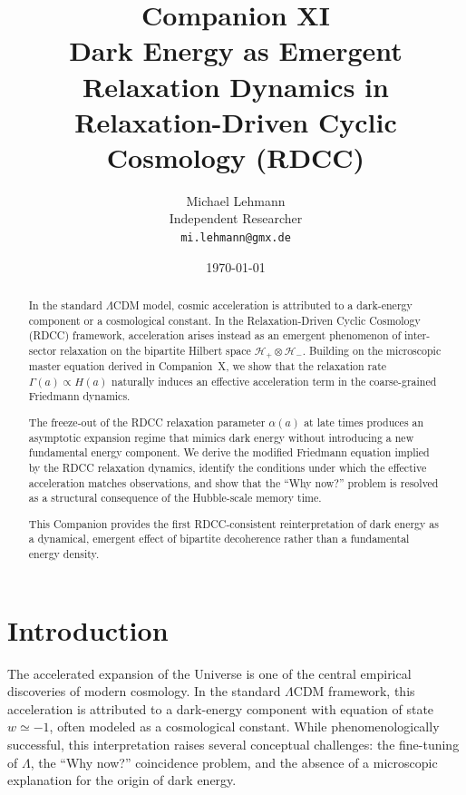 \documentclass[11pt,a4paper]{article}
\title{%
  \textbf{Companion XI}\\[8pt]
  {\Large Dark Energy as Emergent Relaxation Dynamics in}\\[4pt]
  {\Large Relaxation-Driven Cyclic Cosmology (RDCC)}
}
\author{Michael Lehmann\\
Independent Researcher\\
\texttt{mi.lehmann@gmx.de}}
\date{\today}
\newcommand{\Hglobal}{\mathcal{H}_{+}\!\otimes\!\mathcal{H}_{-}}
\newcommand{\Ha}{H(a)}
\newcommand{\GammaR}{\Gamma}
\newcommand{\alphaR}{\alpha}
\begin{document}
\maketitle

\begin{abstract}
In the standard $\Lambda$CDM model, cosmic acceleration is attributed to a dark-energy component or a cosmological constant.
In the Relaxation-Driven Cyclic Cosmology (RDCC) framework, acceleration arises instead as an emergent phenomenon of inter-sector relaxation on the bipartite Hilbert space $\Hglobal$.
Building on the microscopic master equation derived in Companion~X, we show that the relaxation rate $\GammaR(a) \propto \Ha$ naturally induces an effective acceleration term in the coarse-grained Friedmann dynamics.

The freeze-out of the RDCC relaxation parameter $\alphaR(a)$ at late times produces an asymptotic expansion regime that mimics dark energy without introducing a new fundamental energy component.
We derive the modified Friedmann equation implied by the RDCC relaxation dynamics, identify the conditions under which the effective acceleration matches observations, and show that the ``Why now?'' problem is resolved as a structural consequence of the Hubble-scale memory time.

This Companion provides the first RDCC-consistent reinterpretation of dark energy as a dynamical, emergent effect of bipartite decoherence rather than a fundamental energy density.
\end{abstract}


\section{Introduction}

The accelerated expansion of the Universe is one of the central empirical
discoveries of modern cosmology. In the standard $\Lambda$CDM framework, this
acceleration is attributed to a dark-energy component with equation of state
$w \simeq -1$, often modeled as a cosmological constant. While
phenomenologically successful, this interpretation raises several conceptual
challenges: the fine-tuning of $\Lambda$, the ``Why now?'' coincidence problem,
and the absence of a microscopic explanation for the origin of dark energy.
\end{document}

